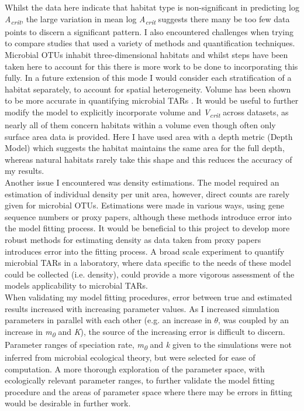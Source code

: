 \noindent Whilst the data here indicate that habitat type is non-significant in predicting log \textit{A\textsubscript{crit}}, the large variation in mean log \textit{A\textsubscript{crit}} suggests there many be too few data points to discern a significant pattern. I also encountered challenges when trying to compare studies that used a variety of methods and quantification techniques. Microbial OTUs inhabit three-dimensional habitats and whilst steps have been taken here to account for this there is more work to be done to incorporating this fully. In a future extension of this mode I would consider each stratification of a habitat separately, to account for spatial heterogeneity. Volume has been shown to be more accurate in quantifying microbial TARs \cite{van2006bacterial}. It would be useful to further modify the model to explicitly incorporate volume and \textit{V\textsubscript{crit}} across datasets, as nearly all of them concern habitats within a volume even though often only surface area data is provided. Here I have used area with a depth metric (Depth Model) which suggests the habitat maintains the same area for the full depth, whereas natural habitats rarely take this shape and this reduces the accuracy of my results. \\

\noindent Another issue I encountered was density estimations. The model required an estimation of individual density per unit area, however, direct counts are rarely given for microbial OTUs. Estimations were made in various ways, using gene sequence numbers or proxy papers, although these methods introduce error into the model fitting process. It would be beneficial to this project to develop more robust methods for estimating density as data taken from proxy papers introduces error into the fitting process. A broad scale experiment to quantify microbial TARs in a laboratory, where data specific to the needs of these model could be collected (i.e. density), could provide a more vigorous assessment of the models applicability to microbial TARs. \\

\noindent When validating my model fitting procedures, error between true and estimated results increased with increasing parameter values. As I increased simulation parameters in parallel with each other (e.g. an increase in $\theta$,  was coupled by an increase in \textit{m\textsubscript{0}} and \textit{K}), the source of the increasing error is difficult to discern. Parameter ranges of speciation rate, \textit{m\textsubscript{0}} and \textit{k} given to the simulations were not inferred from microbial ecological theory, but were selected for ease of computation. A more thorough exploration of the parameter space, with ecologically relevant parameter ranges, to further validate the model fitting procedure and the areas of parameter space where there may be errors in fitting would be desirable in further work. \\

